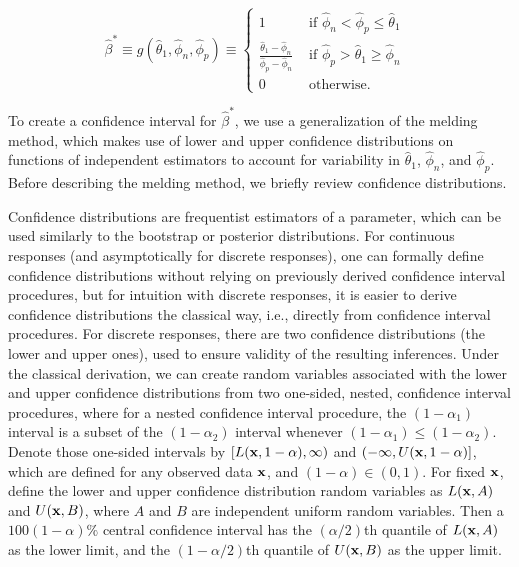 \begin{equation}
\hat{\beta}^* \equiv
g(\hat{\theta}_1, \hat{\phi}_n, \hat{\phi}_p)
\equiv
\left\{
\begin{array}{ll}
1 & \mbox{ if $\hat{\phi}_n < \hat{\phi}_p \leq \hat{\theta}_1$ }  \\
\frac{\hat{\theta}_1 - \hat{\phi}_n}{\hat{\phi}_p - \hat{\phi}_n} &
\mbox{ if $\hat{\phi}_p > \hat{\theta}_1 \geq \hat{\phi}_n$ } \\
0 & \mbox{ otherwise.}
\end{array}
\right.
\label{ch_3:eq:srs-beta-est}
\end{equation}



To create a confidence interval for \( \hat{\beta}^* \), we use a generalization of the melding method, \cite{FayP:2015} which makes use of lower and upper confidence distributions on functions of independent estimators to account for variability in \( \hat{\theta}_1 \), \( \hat{\phi}_n \), and \( \hat{\phi}_p \).
Before describing the melding method, we briefly review confidence distributions.

Confidence distributions are frequentist estimators of a parameter, which can be used similarly to the bootstrap or posterior distributions.
For continuous responses (and asymptotically for discrete responses), one can formally define confidence distributions without relying on previously derived confidence interval procedures,\cite{Xie2013} but for intuition with discrete responses, it is easier to derive confidence distributions the classical way, i.e., directly from confidence interval procedures.
For discrete responses, there are two confidence distributions (the lower and upper ones), used to ensure validity of the resulting inferences.
Under the classical derivation, we can create random variables associated with the lower and upper confidence distributions from two one-sided, nested, confidence interval procedures, where for a nested confidence interval procedure, the $(1-\alpha_1)$ interval is a subset of the $(1-\alpha_2)$ interval whenever $(1-\alpha_1) \leq (1-\alpha_2)$.
Denote those one-sided intervals by $[L({\bf x},1-\alpha), \infty)$ and $(-\infty, U({\bf x},1-\alpha)]$, which are defined for any observed data ${\bf x}$, and $(1-\alpha) \in (0,1)$.
For fixed ${\bf x}$, define the lower and upper confidence distribution random variables as $L({\bf x}, A)$ and $U({\bf x},B)$, where $A$ and $B$ are independent uniform random variables.
Then a $100(1-\alpha)\%$ central confidence interval has the $(\alpha/2)$th quantile of $L({\bf x}, A)$ as the lower limit, and the $(1-\alpha/2)$th quantile of $U({\bf x},B)$ as the upper limit.

